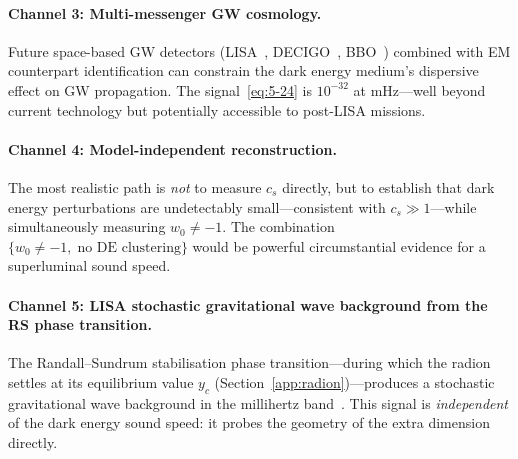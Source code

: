 \paragraph{Channel 3: Multi-messenger GW cosmology.}

Future space-based GW detectors (LISA~\cite{ch5:LISA}, DECIGO~\cite{ch5:DECIGO}, BBO~\cite{ch5:BBO}) combined with EM counterpart identification can constrain the dark energy medium's dispersive effect on GW propagation. The signal~\eqref{eq:5-24} is $10^{-32}$ at mHz---well beyond current technology but potentially accessible to post-LISA missions.

\paragraph{Channel 4: Model-independent reconstruction.}

The most realistic path is \emph{not} to measure $c_s$ directly, but to establish that dark energy perturbations are undetectably small---consistent with $c_s \gg 1$---while simultaneously measuring $w_0 \neq -1$. The combination $\{w_0 \neq -1,\;\text{no DE clustering}\}$ would be powerful circumstantial evidence for a superluminal sound speed.

\paragraph{Channel 5: LISA stochastic gravitational wave background from the RS phase transition.}

The Randall--Sundrum stabilisation phase transition---during which the radion settles at its equilibrium value $y_c$ (Section~\ref{app:radion})---produces a stochastic gravitational wave background in the millihertz band~\cite{ch5:Caprini2016,ch5:Caprini2020}. This signal is \emph{independent} of the dark energy sound speed: it probes the geometry of the extra dimension directly.

\noindent{}

